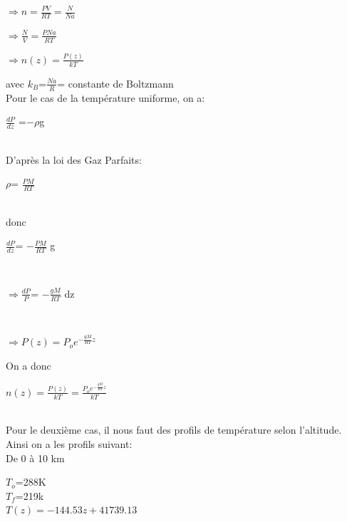 \documentclass[a4paper, 12pt]{report} %
\begin{document}
\begin{center}
    $\Rightarrow n= \frac{PV}{RT}=\frac{N}{Na}$\\
\end{center}

\begin{center}
    $\Rightarrow\frac{N}{V}= \frac{PNa}{RT}$\\ 
\end{center}
\begin{center}
    $\Rightarrow n(z)= \frac{P(z)}{kT} $\\  
\end{center}   

avec $k_B$=$\frac{Na}{R}$= constante de Boltzmann\\

Pour le cas de la température uniforme, on a:

\begin{center}
    $\frac{dP}{dz}$ =$-\rho$g
\end{center}\\
D'après la loi des Gaz Parfaits: \\
\begin{center}
    $\rho$= $\frac{PM}{RT}$
\end{center}\\
donc \\
\begin{center}
    $\frac{dP}{dz}$= $-\frac{PM}{RT}$ g
\end{center}\\

\begin{center}
    $\Rightarrow\frac{dP}{P}$= $-\frac{gM}{RT}$ dz
\end{center}\\

\begin{center}
    $\Rightarrow P(z)= P_o e^{-\frac{gM}{RT} z }$
\end{center}

On a donc 
\begin{center}
	$n(z)=\frac{P(z)}{kT}= \frac{ P_o e^{-\frac{gM}{RT} z }}{kT}$
 \end{center}\\

Pour le deuxième cas, il nous faut des profils de température selon l'altitude.
Ainsi on a les profils suivant:\\
De 0 à 10 km \\
\begin{center}
    $T_o$=288K\\
    $T_f$=219k\\
    $T(z)=-144.53z+41739.13$
\end{center}\\
\end{document}
